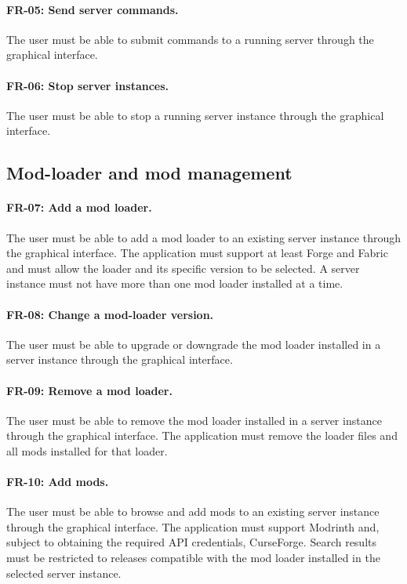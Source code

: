 \paragraph{FR-05: Send server commands.} The user must be able to submit commands to a running server through the graphical interface.

\paragraph{FR-06: Stop server instances.} The user must be able to stop a running server instance through the graphical interface.

\subsection{Mod-loader and mod management}

\paragraph{FR-07: Add a mod loader.} The user must be able to add a mod loader to an existing server instance through the graphical interface. The application must support at least Forge and Fabric and must allow the loader and its specific version to be selected. A server instance must not have more than one mod loader installed at a time.

\paragraph{FR-08: Change a mod-loader version.} The user must be able to upgrade or downgrade the mod loader installed in a server instance through the graphical interface.

\paragraph{FR-09: Remove a mod loader.} The user must be able to remove the mod loader installed in a server instance through the graphical interface. The application must remove the loader files and all mods installed for that loader.

\paragraph{FR-10: Add mods.} The user must be able to browse and add mods to an existing server instance through the graphical interface. The application must support Modrinth and, subject to obtaining the required API credentials, CurseForge. Search results must be restricted to releases compatible with the mod loader installed in the selected server instance.

